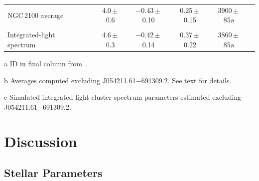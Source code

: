 \begin{table}
\begin{center}
\begin{threeparttable}
\begin{tabular}{lc ccccl}
\\
NGC\,2100 average\tnote{b} & & 4.0\,$\pm$\,0.6 & $-$0.43\,$\pm$\,0.10 & 0.25\,$\pm$\,0.15 & 3900\,$\pm$\,85\o\\
\\
Integrated-light spectrum\tnote{c}             & & 4.6\,$\pm$\,0.3 & $-$0.42\,$\pm$\,0.14 & 0.37\,$\pm$\,0.22 & 3860\,$\pm$\,85\o\\
  \hline
  \end{tabular}
\begin{tablenotes}
    \item [a] ID in final column from{~\cite{1974A&AS...15..261R}}.
    \item [b] Averages computed excluding J054211.61$-$691309.2. See text for details.
    \item [c] Simulated integrated light cluster spectrum parameters estimated excluding J054211.61$-$691309.2.
\end{tablenotes}
  \end{threeparttable}
  \end{center}
\end{table}


\section{Discussion} %
\label{sec:ngc2100disc}

\subsection{Stellar Parameters} %
\label{sub:stellar_parameters_disc}

